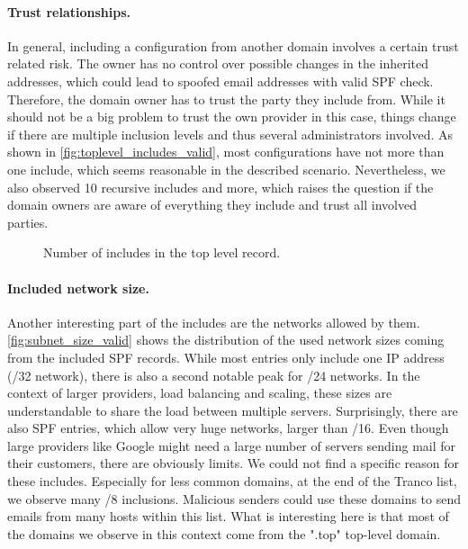 \paragraph{Trust relationships.}
In general, including a configuration from another domain involves a certain trust related risk.
The owner has no control over possible changes in the inherited addresses, which could lead to spoofed email addresses with valid \ac{SPF} check.
Therefore, the domain owner has to trust the party they include from.
While it should not be a big problem to trust the own provider in this case, things change if there are multiple inclusion levels and thus several administrators involved.
As shown in \autoref{fig:toplevel_includes_valid}, most configurations have not more than one include, which seems reasonable in the described scenario.
Nevertheless, we also observed 10 recursive includes and more, which raises the question if the domain owners are aware of everything they include and trust all involved parties.

\begin{figure}[htbp]
	\centerline{}
	\vspace{-6pt}
	\caption{Number of includes in the top level record.}
	\label{fig:toplevel_includes_valid}
\end{figure}

\paragraph{Included network size.}
Another interesting part of the includes are the networks allowed by them.
\autoref{fig:subnet_size_valid} shows the distribution of the used network sizes coming from the included \ac{SPF} records.
While most entries only include one IP address (/32 network), there is also a second notable peak for /24 networks.
In the context of larger providers, load balancing and scaling, these sizes are understandable to share the load between multiple servers.
Surprisingly, there are also \ac{SPF} entries, which allow very huge networks, larger than /16.
Even though large providers like Google might need a large number of servers sending mail for their customers, there are obviously limits.
We could not find a specific reason for these includes.
Especially for less common domains, at the end of the Tranco list, we observe many /8 inclusions.
Malicious senders could use these domains to send emails from many hosts within this list.
What is interesting here is that most of the domains we observe in this context come from the ".top" top-level domain.  

